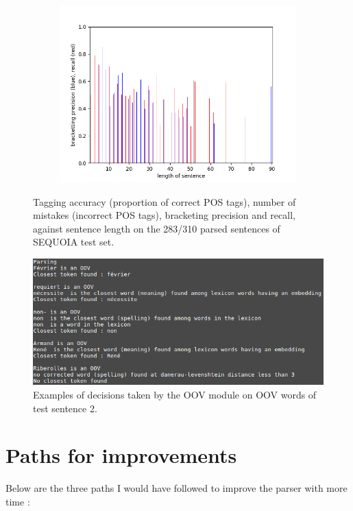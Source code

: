 \documentclass[8pt,twocolumn,letterpaper]{article}
\begin{document}
\begin{figure}[h!]
\begin{subfigure}[b]{0.8\linewidth}
        \includegraphics[width=\linewidth]{report/3.png}
    \end{subfigure}
    \caption{Tagging accuracy (proportion of correct POS tags), number of mistakes (incorrect POS tags), bracketing precision and recall, against sentence length on the 283/310 parsed sentences of SEQUOIA test set.}
    \label{mrcnn}
\end{figure}

\begin{figure}[h!]
\begin{center}
\includegraphics[scale=0.4]{report/spelling.png}
\caption{Examples of decisions taken by the OOV module on OOV words of test sentence 2.}
\end{center}
\end{figure}

\section{Paths for improvements}

Below are the three paths I would have followed to improve the parser with more time :
\end{document}
